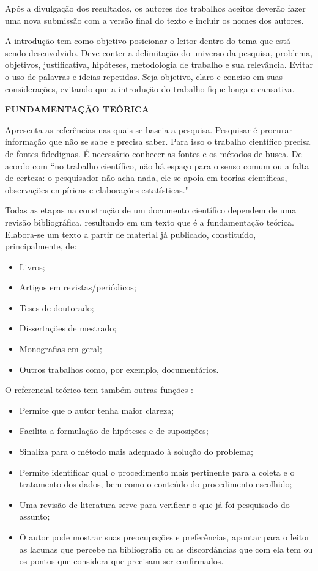 \documentclass[11pt,a4paper]{article}
\begin{document}
Após a divulgação dos resultados, os autores dos trabalhos aceitos deverão fazer uma nova submissão com a versão final do texto e incluir os nomes dos autores. 

A introdução tem como objetivo posicionar o leitor dentro do tema que está sendo desenvolvido. Deve conter a delimitação do universo da pesquisa, problema, objetivos, justificativa, hipóteses, metodologia de trabalho e sua relevância. Evitar o uso de palavras e ideias repetidas. Seja objetivo, claro e conciso em suas considerações, evitando que a introdução do trabalho fique longa e cansativa.



\vspace{0.5cm}
\noindent
{\fontsize{12}{12}\selectfont
\textbf{FUNDAMENTAÇÃO TEÓRICA}}

Apresenta as referências nas quais se baseia a pesquisa. Pesquisar é procurar informação que não se sabe e precisa saber. Para isso o trabalho científico precisa de fontes fidedignas. É necessário conhecer as fontes e os métodos de busca.  De acordo com  ``no trabalho científico, não há espaço para o senso comum ou a falta de certeza: o pesquisador não acha nada, ele se apoia em teorias científicas, observações empíricas e elaborações estatísticas."

Todas as etapas na construção de um documento científico dependem de uma revisão bibliográfica, resultando em um texto que é a fundamentação teórica. Elabora-se um texto a partir de material já publicado, constituído, principalmente, de: \begin{itemize}[noitemsep]
    \item Livros;
    \item Artigos em revistas/periódicos;
    \item Teses de doutorado;
    \item Dissertações de mestrado;
    \item Monografias em geral;
    \item Outros trabalhos como, por exemplo, documentários.
\end{itemize}
O referencial teórico tem também outras funções \cite{Vergara:97}:
\begin{itemize}[noitemsep]
    \item Permite que o autor tenha maior clareza;
    \item Facilita a formulação de hipóteses e de suposições;
    \item Sinaliza para o método mais adequado à solução do problema;
    \item Permite identificar qual o procedimento mais pertinente para a coleta e o tratamento dos dados, bem como o conteúdo do procedimento escolhido;
    \item Uma revisão de literatura serve para verificar o que já foi pesquisado do assunto;
    \item O autor pode mostrar suas preocupações e preferências, apontar para o leitor as lacunas que percebe na bibliografia ou as discordâncias que com ela tem ou os pontos que considera que precisam ser confirmados.
\end{itemize}
\end{document}
